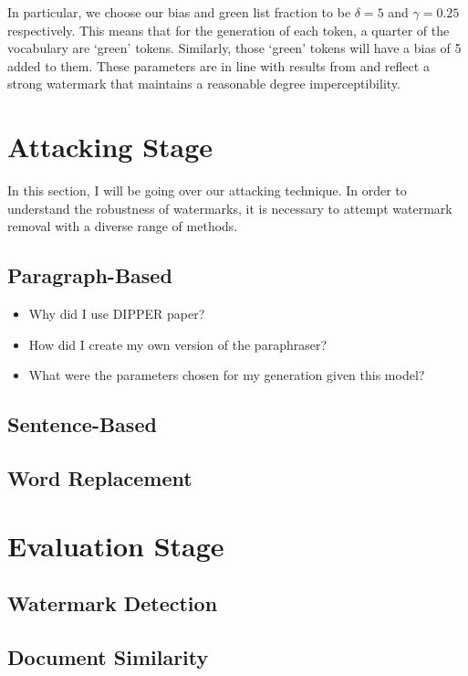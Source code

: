 \documentclass{l4proj}
\theoremstyle{definition}
\begin{document}
        In particular, we choose our bias and green list fraction to be $\delta = 5$ and $\gamma = 0.25$ respectively. This means that for the generation of each token, a quarter of the vocabulary are `green' tokens. Similarly, those `green' tokens will have a bias of 5 added to them. These parameters are in line with results from \citet{kirchenbauer2023watermark} and reflect a strong watermark that maintains a reasonable degree imperceptibility.

\section{Attacking Stage}
    In this section, I will be going over our attacking technique. In order to understand the robustness of watermarks, it is necessary to attempt watermark removal with a diverse range of methods. 

    

    \subsection{Paragraph-Based}
        \begin{itemize}
            \item Why did I use DIPPER paper?
            \item How did I create my own version of the paraphraser? 
            \item What were the parameters chosen for my generation given this model?
        \end{itemize}
    
    \subsection{Sentence-Based}
    \subsection{Word Replacement}

\section{Evaluation Stage}
    \subsection{Watermark Detection}
    \subsection{Document Similarity}
\end{document}
